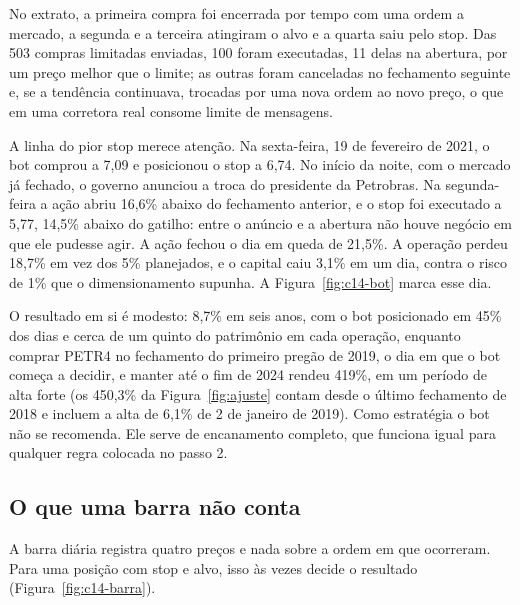 No extrato, a primeira compra foi encerrada por tempo com uma ordem a mercado, a segunda e a terceira atingiram o alvo e a quarta saiu pelo stop. Das 503 compras limitadas enviadas, 100 foram executadas, 11 delas na abertura, por um preço melhor que o limite; as outras foram canceladas no fechamento seguinte e, se a tendência continuava, trocadas por uma nova ordem ao novo preço, o que em uma corretora real consome limite de mensagens.

A linha do pior stop merece atenção. Na sexta-feira, 19 de fevereiro de 2021, o bot comprou a 7,09 e posicionou o stop a 6,74. No início da noite, com o mercado já fechado, o governo anunciou a troca do presidente da Petrobras. Na segunda-feira a ação abriu 16,6\% abaixo do fechamento anterior, e o stop foi executado a 5,77, 14,5\% abaixo do gatilho: entre o anúncio e a abertura não houve negócio em que ele pudesse agir. A ação fechou o dia em queda de 21,5\%. A operação perdeu 18,7\% em vez dos 5\% planejados, e o capital caiu 3,1\% em um dia, contra o risco de 1\% que o dimensionamento supunha. A Figura~\ref{fig:c14-bot} marca esse dia.


O resultado em si é modesto: 8,7\% em seis anos, com o bot posicionado em 45\% dos dias e cerca de um quinto do patrimônio em cada operação, enquanto comprar PETR4 no fechamento do primeiro pregão de 2019, o dia em que o bot começa a decidir, e manter até o fim de 2024 rendeu 419\%, em um período de alta forte (os 450,3\% da Figura~\ref{fig:ajuste} contam desde o último fechamento de 2018 e incluem a alta de 6,1\% de 2 de janeiro de 2019). Como estratégia o bot não se recomenda. Ele serve de encanamento completo, que funciona igual para qualquer regra colocada no passo 2.

\subsection{O que uma barra não conta}

A barra diária registra quatro preços e nada sobre a ordem em que ocorreram. Para uma posição com stop e alvo, isso às vezes decide o resultado (Figura~\ref{fig:c14-barra}).


